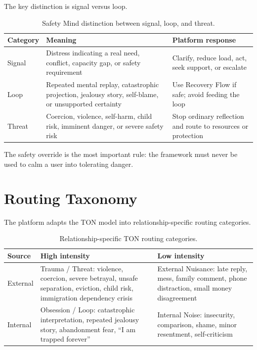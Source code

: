 \documentclass[11pt]{article}
\begin{document}
The key distinction is signal versus loop.

\begin{table}[htbp]
\centering
\caption{Safety Mind distinction between signal, loop, and threat.}
\begin{tabularx}{\textwidth}{p{}YY}
\toprule
Category & Meaning & Platform response \\
\midrule
Signal & Distress indicating a real need, conflict, capacity gap, or safety requirement & Clarify, reduce load, act, seek support, or escalate \\
Loop & Repeated mental replay, catastrophic projection, jealousy story, self-blame, or unsupported certainty & Use Recovery Flow if safe; avoid feeding the loop \\
Threat & Coercion, violence, self-harm, child risk, imminent danger, or severe safety risk & Stop ordinary reflection and route to resources or protection \\
\bottomrule
\end{tabularx}
\end{table}

The safety override is the most important rule: the framework must never be used to calm a user into tolerating danger.

\section{Routing Taxonomy}

The platform adapts the TON model into relationship-specific routing categories.

\begin{table}[htbp]
\centering
\caption{Relationship-specific TON routing categories.}
\begin{tabularx}{\textwidth}{p{}YY}
\toprule
Source & High intensity & Low intensity \\
\midrule
External & Trauma / Threat: violence, coercion, severe betrayal, unsafe separation, eviction, child risk, immigration dependency crisis & External Nuisance: late reply, mess, family comment, phone distraction, small money disagreement \\
Internal & Obsession / Loop: catastrophic interpretation, repeated jealousy story, abandonment fear, ``I am trapped forever'' & Internal Noise: insecurity, comparison, shame, minor resentment, self-criticism \\
\bottomrule
\end{tabularx}
\end{table}
\end{document}
